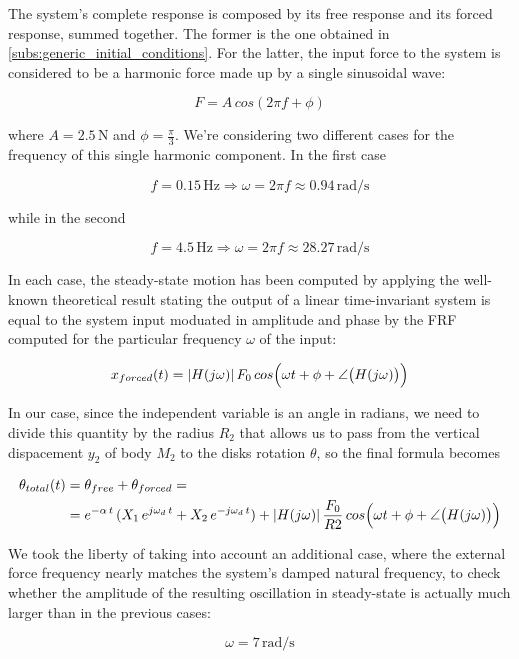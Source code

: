 \documentclass[a4paper,12pt,oneside]{article}
\begin{document}
The system's complete response is composed by its free response and its forced response, summed together. The former is the one obtained in \ref{subs:generic_initial_conditions}. For the latter, the input force to the system is considered to be a harmonic force made up by a single sinusoidal wave:

\[ F = A \, cos(2 \pi f + \phi) \]

where $ A = 2.5 \, \text{N} $ and $ \phi = \frac{\pi}{3} $. We're considering two different cases for the frequency of this single harmonic component. In the first case

\[
	f = 0.15 \, \text{Hz} \Rightarrow %
	\omega = 2 \pi f \approx 0.94 \, \text{rad/s}
\]

while in the second

\[
	f = 4.5 \, \text{Hz} \Rightarrow %
	\omega = 2 \pi f \approx 28.27 \, \text{rad/s}
\]

 In each case, the steady-state motion has been computed by applying the well-known theoretical result stating the output of a linear time-invariant system is equal to the system input moduated in amplitude and phase by the FRF computed for the particular frequency $ \omega $ of the input:

\[
	x_{forced}(t) = |H(j \omega)| \, F_0 \, %
		cos\Bigl(\omega t + \phi + \angle\bigl(H(j \omega)\bigr)\Bigr)
\]

In our case, since the independent variable is an angle in radians, we need to divide this quantity by the radius $ R_2 $ that allows us to pass from the vertical dispacement $ y_2 $ of body $ M_2 $ to the disks rotation $ \theta $, so the final formula becomes

\[ \begin{split}
	\theta_{total}(t) & = \theta_{free} + \theta_{forced} = \\
										& = e^{-\alpha \, t} \, %
											(X_1 \, e^{j \omega_d \, t} + %
											X_2 \, e^{- j \omega_d \, t}) + %
											|H(j \omega)| \, \frac{F_0}{R2} \, %
											cos\Bigl(\omega t + \phi + %
											\angle\bigl(H(j \omega)\bigr)\Bigr)
\end{split} \]

We took the liberty of taking into account an additional case, where the external force frequency nearly matches the system's damped natural frequency, to check whether the amplitude of the resulting oscillation in steady-state is actually much larger than in the previous cases:

\[ \omega = 7 \, \text{rad/s} \]
\end{document}
